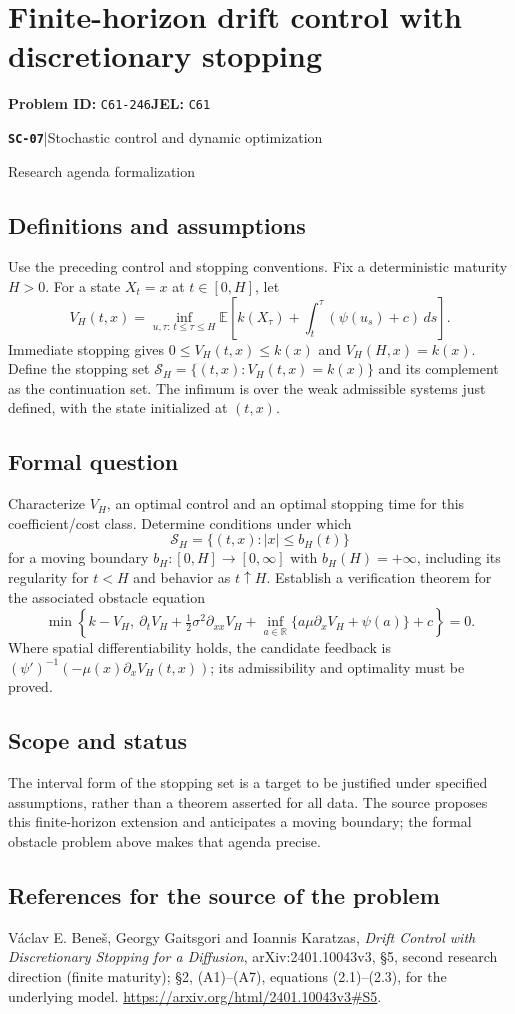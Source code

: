 \documentclass[11pt,a4paper]{article}
\newcommand{\R}{\mathbb R}
\newcommand{\E}{\mathbb E}
\newcommand{\entrymeta}[3]{{\sffamily\small\color{muted}\textbf{\texttt{#1}}\quad|\quad #2\par #3\par}}
\begin{document}
\section*{Finite-horizon drift control with discretionary stopping}
\textbf{Problem ID:} \texttt{C61-246}\quad \textbf{JEL:} \texttt{C61}\par
\label{problem:OP-0568}
\label{beyond:SC-07}
\entrymeta{SC-07}{Stochastic control and dynamic optimization}{Research agenda formalization}
\subsection*{Definitions and assumptions}
Use the preceding control and stopping conventions. Fix a deterministic
maturity $H>0$. For a state $X_t=x$ at $t\in[0,H]$, let
\[
 V_H(t,x)=\inf_{u,\tau:\,t\leq\tau\leq H}
 \E\left[k(X_\tau)+\int_t^\tau(\psi(u_s)+c)\,ds\right].
\]
Immediate stopping gives $0\leq V_H(t,x)\leq k(x)$ and
$V_H(H,x)=k(x)$. Define the stopping set
$\mathcal S_H=\{(t,x):V_H(t,x)=k(x)\}$ and its complement as the
continuation set. The infimum is over the weak admissible systems just
defined, with the state initialized at $(t,x)$.
\subsection*{Formal question}
Characterize $V_H$, an optimal control and an optimal stopping time for
this coefficient/cost class. Determine conditions under which
\[
 \mathcal S_H=\{(t,x):|x|\leq b_H(t)\}
\]
for a moving boundary $b_H:[0,H]\to[0,\infty]$ with
$b_H(H)=+\infty$, including its regularity for $t<H$ and behavior as
$t\uparrow H$. Establish a verification theorem for the associated
obstacle equation
\[
 \min\left\{k-V_H,\ \partial_tV_H+
 \tfrac12\sigma^2\partial_{xx}V_H+
 \inf_{a\in\R}\{a\mu\partial_xV_H+\psi(a)\}+c\right\}=0.
\]
Where spatial differentiability holds, the candidate feedback is
$(\psi')^{-1}(-\mu(x)\partial_xV_H(t,x))$; its admissibility and
optimality must be proved.
\subsection*{Scope and status}
The interval form of the stopping set is a target to be justified under
specified assumptions, rather than a theorem asserted for all data.
The source proposes this finite-horizon extension and anticipates a moving
boundary; the formal obstacle problem above makes that agenda precise.
\subsection*{References for the source of the problem}
V\'aclav E. Bene\v{s}, Georgy Gaitsgori and Ioannis Karatzas,
\emph{Drift Control with Discretionary Stopping for a Diffusion},
arXiv:2401.10043v3, \S5, second research direction (finite maturity);
\S2, (A1)--(A7), equations (2.1)--(2.3), for the underlying model.
\url{https://arxiv.org/html/2401.10043v3#S5}.
\end{document}
